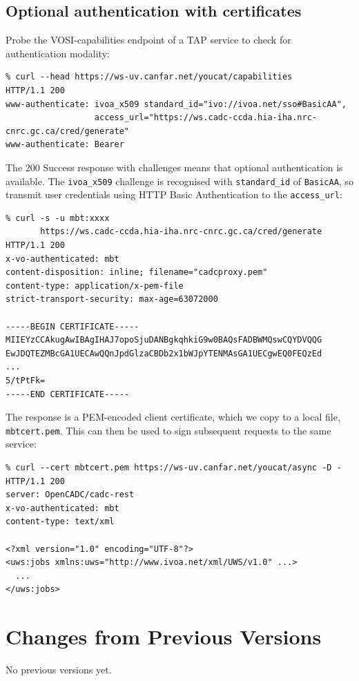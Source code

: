 \documentclass[11pt,a4paper]{ivoa}
\begin{document}
\subsection{Optional authentication with certificates}


Probe the VOSI-capabilities endpoint of a TAP service to check
for authentication modality:
{\footnotesize
\begin{verbatim}
% curl --head https://ws-uv.canfar.net/youcat/capabilities
HTTP/1.1 200
www-authenticate: ivoa_x509 standard_id="ivo://ivoa.net/sso#BasicAA",
                  access_url="https://ws.cadc-ccda.hia-iha.nrc-cnrc.gc.ca/cred/generate"
www-authenticate: Bearer
\end{verbatim}
}

\noindent
The 200 Success response with challenges means that optional authentication
is available.
The \verb|ivoa_x509| challenge is recognised with \verb|standard_id|
of \verb|BasicAA|, so transmit user credentials using
HTTP Basic Authentication to the \verb|access_url|:

{\footnotesize
\begin{verbatim}
% curl -s -u mbt:xxxx
       https://ws.cadc-ccda.hia-iha.nrc-cnrc.gc.ca/cred/generate
HTTP/1.1 200
x-vo-authenticated: mbt
content-disposition: inline; filename="cadcproxy.pem"
content-type: application/x-pem-file
strict-transport-security: max-age=63072000

-----BEGIN CERTIFICATE-----
MIIEYzCCAkugAwIBAgIHAJ7opoSjuDANBgkqhkiG9w0BAQsFADBWMQswCQYDVQQG
EwJDQTEZMBcGA1UECAwQQnJpdGlzaCBDb2x1bWJpYTENMAsGA1UECgwEQ0FEQzEd
...
5/tPtFk=
-----END CERTIFICATE-----
\end{verbatim}
}

\noindent
The response is a PEM-encoded client certificate, which we copy
to a local file, \verb|mbtcert.pem|.
This can then be used to sign subsequent requests to the same service:
{\footnotesize
\begin{verbatim}
% curl --cert mbtcert.pem https://ws-uv.canfar.net/youcat/async -D -
HTTP/1.1 200
server: OpenCADC/cadc-rest
x-vo-authenticated: mbt
content-type: text/xml

<?xml version="1.0" encoding="UTF-8"?>
<uws:jobs xmlns:uws="http://www.ivoa.net/xml/UWS/v1.0" ...>
  ...
</uws:jobs>
\end{verbatim}
}



\appendix
\section{Changes from Previous Versions}

No previous versions yet.



\end{document}
